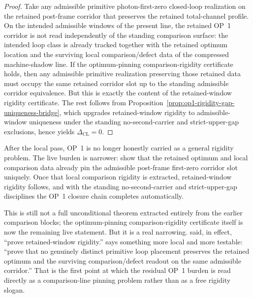 \begin{proof}
Take any admissible primitive photon-first-zero closed-loop realization on the retained post-frame corridor that preserves the retained total-channel profile. On the intended admissible windows of the present line, the retained OP~1 corridor is not read independently of the standing comparison surface: the intended loop class is already tracked together with the retained optimum location and the surviving local comparison/defect data of the compressed machine-shadow line. If the optimum-pinning comparison-rigidity certificate holds, then any admissible primitive realization preserving those retained data must occupy the same retained corridor slot up to the standing admissible corridor equivalence. But this is exactly the content of the retained-window rigidity certificate. The rest follows from Proposition~\ref{prop:op1-rigidity-gap-uniqueness-bridge}, which upgrades retained-window rigidity to admissible-window uniqueness under the standing no-second-carrier and strict-upper-gap exclusions, hence yields \(\Delta_{\mathrm{CL}}=0\).
\end{proof}

\begin{corollary}
\label{cor:op1-live-burden-after-r12}
After the local pass, OP~1 is no longer honestly carried as a general rigidity problem. The live burden is narrower: show that the retained optimum and local comparison data already pin the admissible post-frame first-zero corridor slot uniquely. Once that local comparison rigidity is extracted, retained-window rigidity follows, and with the standing no-second-carrier and strict-upper-gap disciplines the OP~1 closure chain completes automatically.
\end{corollary}

\begin{remark}
This is still not a full unconditional theorem extracted entirely from the earlier comparison blocks; the optimum-pinning comparison-rigidity certificate itself is now the remaining live statement. But it is a real narrowing. said, in effect, ``prove retained-window rigidity.'' says something more local and more testable: ``prove that no genuinely distinct primitive loop placement preserves the retained optimum and the surviving comparison/defect readout on the same admissible corridor.'' That is the first point at which the residual OP~1 burden is read directly as a comparison-line pinning problem rather than as a free rigidity slogan.
\end{remark}

